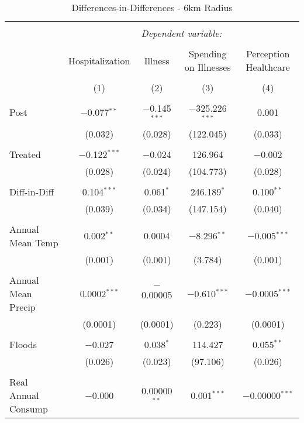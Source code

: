 
\begin{table}[!htbp] \centering 
  \caption{Differences-in-Differences - 6km Radius} 
  \label{} 
\begin{tabular}{@{\extracolsep{5pt}}lcccc} 
\\[-1.8ex]\hline 
\hline \\[-1.8ex] 
 & \multicolumn{4}{c}{\textit{Dependent variable:}} \\ 
\cline{2-5} 
\\[-1.8ex] & Hospitalization & Illness & Spending on Illnesses & Perception Healthcare \\ 
\\[-1.8ex] & (1) & (2) & (3) & (4)\\ 
\hline \\[-1.8ex] 
 Post & $-$0.077$^{**}$ & $-$0.145$^{***}$ & $-$325.226$^{***}$ & 0.001 \\ 
  & (0.032) & (0.028) & (122.045) & (0.033) \\ 
  & & & & \\ 
 Treated & $-$0.122$^{***}$ & $-$0.024 & 126.964 & $-$0.002 \\ 
  & (0.028) & (0.024) & (104.773) & (0.028) \\ 
  & & & & \\ 
 Diff-in-Diff & 0.104$^{***}$ & 0.061$^{*}$ & 246.189$^{*}$ & 0.100$^{**}$ \\ 
  & (0.039) & (0.034) & (147.154) & (0.040) \\ 
  & & & & \\ 
 Annual Mean Temp & 0.002$^{**}$ & 0.0004 & $-$8.296$^{**}$ & $-$0.005$^{***}$ \\ 
  & (0.001) & (0.001) & (3.784) & (0.001) \\ 
  & & & & \\ 
 Annual Mean Precip & 0.0002$^{***}$ & $-$0.00005 & $-$0.610$^{***}$ & $-$0.0005$^{***}$ \\ 
  & (0.0001) & (0.0001) & (0.223) & (0.0001) \\ 
  & & & & \\ 
 Floods & $-$0.027 & 0.038$^{*}$ & 114.427 & 0.055$^{**}$ \\ 
  & (0.026) & (0.023) & (97.106) & (0.026) \\ 
  & & & & \\ 
 Real Annual Consump & $-$0.000 & 0.00000$^{**}$ & 0.001$^{***}$ & $-$0.00000$^{***}$ \\ 

\end{tabular}
\end{table}
